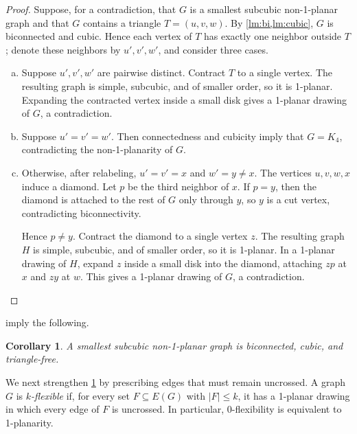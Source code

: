 \documentclass[a4paper,11pt]{article}
\theoremstyle{plain}
\newtheorem{corollary}{Corollary}
\theoremstyle{definition}  %
\newcommand{\df}[1]{\textcolor{defblue}{\emph{#1}}}
\begin{document}
\begin{proof}
    Suppose, for a contradiction, that $G$ is a smallest subcubic
    non-1-planar graph and that $G$ contains a triangle $T=(u,v,w)$.  By
    \cref{lm:bi,lm:cubic}, $G$ is biconnected and cubic.  Hence each vertex
    of $T$ has exactly one neighbor outside $T$; denote these neighbors by
    $u',v',w'$, and consider three cases.

    \begin{enumerate}[(a)]
        \item Suppose $u',v',w'$ are pairwise distinct.  Contract $T$ to a
        single vertex.  The resulting graph is simple, subcubic, and of
        smaller order, so it is 1-planar.  Expanding the contracted vertex
        inside a small disk gives a 1-planar drawing of $G$, a contradiction.

        \item Suppose $u'=v'=w'$.  Then connectedness and cubicity imply that
        $G=K_4$, contradicting the non-1-planarity of $G$.

        \item Otherwise, after relabeling, $u'=v'=x$ and $w'=y\ne x$.  The
        vertices $u,v,w,x$ induce a diamond.  Let $p$ be the third neighbor
        of $x$.  If $p=y$, then the diamond is attached to the rest of $G$
        only through $y$, so $y$ is a cut vertex, contradicting
        biconnectivity.

        Hence $p\ne y$.  Contract the diamond to a single vertex $z$.  The
        resulting graph $H$ is simple, subcubic, and of smaller order, so it
        is 1-planar.  In a 1-planar drawing of $H$, expand $z$ inside a small
        disk into the diamond, attaching $zp$ at $x$ and $zy$ at $w$.  This
        gives a 1-planar drawing of $G$, a contradiction.
    \end{enumerate}
\end{proof}

 imply the following.

\begin{corollary}\label{cor:minimal-subcubic}
    A smallest subcubic non-1-planar graph is biconnected, cubic, and
    triangle-free.
\end{corollary}

We next strengthen \cref{cor:minimal-subcubic} by prescribing edges that must
remain uncrossed.  A graph $G$ is \df{$k$-flexible} if, for every set
$F\subseteq E(G)$ with $|F|\leq k$, it has a 1-planar drawing in which every
edge of $F$ is uncrossed.  In particular, $0$-flexibility is equivalent to
1-planarity.
\end{document}
